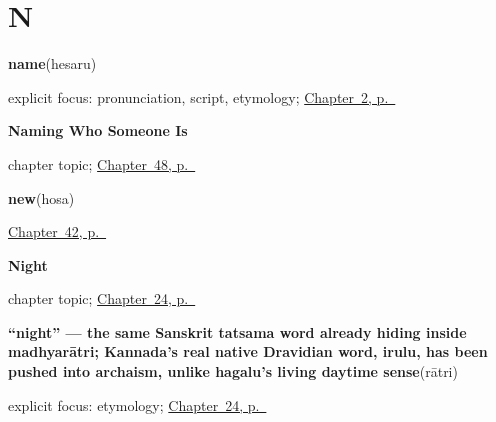 \section*{N}

\noindent\begin{minipage}[t]{\linewidth}
\raggedright
\textbf{name}\enspace\emph{}\enspace(hesaru)\par
\footnotesize explicit focus: pronunciation, script, etymology; \hyperref[ch:introductions]{Chapter~2, p.~\pageref*{ch:introductions}}
\end{minipage}\par\smallskip

\noindent\begin{minipage}[t]{\linewidth}
\raggedright
\textbf{Naming Who Someone Is}\par
\footnotesize chapter topic; \hyperref[ch:ka-roles]{Chapter~48, p.~\pageref*{ch:ka-roles}}
\end{minipage}\par\smallskip

\noindent\begin{minipage}[t]{\linewidth}
\raggedright
\textbf{new}\enspace\emph{}\enspace(hosa)\par
\footnotesize \hyperref[ch:kn-describing-things]{Chapter~42, p.~\pageref*{ch:kn-describing-things}}
\end{minipage}\par\smallskip

\noindent\begin{minipage}[t]{\linewidth}
\raggedright
\textbf{Night}\par
\footnotesize chapter topic; \hyperref[ch:ka-night]{Chapter~24, p.~\pageref*{ch:ka-night}}
\end{minipage}\par\smallskip

\noindent\begin{minipage}[t]{\linewidth}
\raggedright
\textbf{\textquotedblleft{}night\textquotedblright{} — the same Sanskrit tatsama word already hiding inside madhyarātri; Kannada's real native Dravidian word, irulu, has been pushed into archaism, unlike hagalu's living daytime sense}\enspace\emph{}\enspace(rātri)\par
\footnotesize explicit focus: etymology; \hyperref[ch:ka-night]{Chapter~24, p.~\pageref*{ch:ka-night}}
\end{minipage}\par\smallskip

